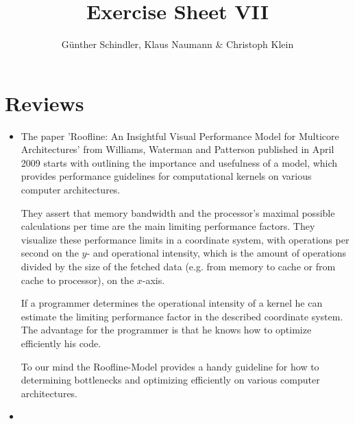 \documentclass[oneside, a4paper, DIV=10]{scrartcl}
\title{Exercise Sheet VII}
\author{G\"unther Schindler, Klaus Naumann \& Christoph Klein}
\begin{document}
\maketitle


\section*{Reviews}
\begin{itemize}
    \item 
    The paper 'Roofline: An Insightful Visual Performance Model for Multicore
    Architectures' from Williams, Waterman and Patterson published in April 2009
    starts with outlining the importance and usefulness of a model, which provides
    performance guidelines for computational kernels on various computer
    architectures.

    They assert that memory bandwidth and the processor's maximal possible
    calculations per time are the main limiting performance factors. They
    visualize these performance limits in a coordinate system, with
    operations per second on the $y$- and operational intensity,  which is
    the amount of operations divided by the size of the fetched data
    (e.g. from memory to cache or from cache to processor), on the 
    $x$-axis.

    If a programmer determines the operational intensity of a kernel he can
    estimate the limiting performance factor in the described coordinate
    system. The advantage for the programmer is that he knows how to optimize
    efficiently his code.

    To our mind the Roofline-Model provides a handy guideline for how to
    determining bottlenecks and optimizing efficiently on various 
    computer architectures.
    \item
\end{itemize}
\end{document}
